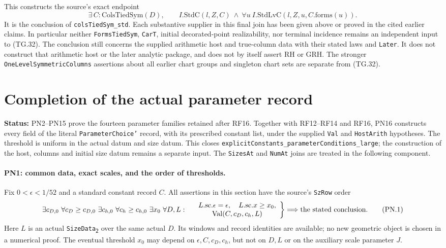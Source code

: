 \documentclass[11pt,a4paper]{article}
\numberwithin{equation}{section}
\theoremstyle{remark}\newtheorem{remark}[theorem]{Remark}
\newcommand{\status}[1]{\textbf{Status:} #1}
\begin{document}
This constructs the source's exact endpoint
\[
 \exists\,C:\mathrm{ColsTiedSym}(D),\qquad
       I.\mathrm{StdC}(l,Z,C)\ \land\
       \forall u\ I.\mathrm{StdLvC}(l,Z,u,C.\mathrm{forms}(u)).
 \tag{TG.32}
\]
It is the conclusion of \texttt{colsTiedSym\_\allowbreak std}. Each
substantive supplier in this final join has been given above
or proved in the cited earlier claims. In particular neither
\texttt{FormsTiedSym}, \texttt{CarT}, initial decorated-point
realizability, nor terminal incidence remains an independent
input to (TG.32). The conclusion still concerns the supplied
arithmetic host and true-column data with their stated laws
and \texttt{Later}. It does not construct that arithmetic
host or the later analytic package, and does not by itself
assert RH or GRH. The stronger \texttt{OneLevelSymmetricColumns}
assertions about all earlier chart groups and singleton chart
sets are separate from (TG.32).



\section{Completion of the actual parameter record}
\label{sec:parameter-completion}

\status{PN2--PN15 prove the fourteen parameter families retained after RF16.
Together with RF12--RF14 and RF16, PN16 constructs every field of the
literal \texttt{ParameterChoice'} record, with its prescribed constant
list, under the supplied \texttt{Val} and \texttt{HostArith} hypotheses.
The threshold is uniform in the actual datum and size datum. This closes
\texttt{explicitConstants\_\allowbreak parameterConditions\_\allowbreak large}; the construction
of the host, columns and initial size datum remains a separate input.
The \texttt{SizesAt} and \texttt{NumAt} joins are treated in the following
component.}

\paragraph{PN1: common data, exact scales, and the order of thresholds.}
Fix $0<\epsilon<1/52$ and a standard constant record $C$. All assertions
in this section have the source's \texttt{SzRow} order
\[
 \exists c_{D,0}\ \forall c_D\geq c_{D,0}\
 \exists c_{h,0}\ \forall c_h\geq c_{h,0}\
 \exists x_0\ \forall D,L:\quad
 \left.
 \begin{array}{c}
 L.\mathrm{sc}.\epsilon=\epsilon,\quad L.\mathrm{sc}.x\geq x_0,\\
 \operatorname{Val}(C,c_D,c_h,L)
 \end{array}\right\}\Longrightarrow\hbox{the stated conclusion}.
                                                               \tag{PN.1}
\]
Here $L$ is an actual \texttt{SizeData\textsubscript{2}} over the same
actual $D$. Its windows and record identities are available; no new
geometric object is chosen in a numerical proof. The eventual threshold
$x_0$ may depend on $\epsilon,C,c_D,c_h$, but not on $D,L$ or on the
auxiliary scale parameter $J$.
\end{document}
